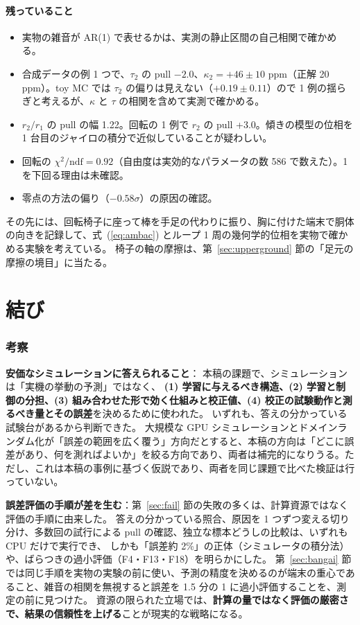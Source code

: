 \documentclass[paper=a4paper,fontsize=10pt,twocolumn,column_gap=2zw,line_length=24zw,number_of_lines=46,head_space=20mm]{jlreq}
\begin{document}
\subsection{残っていること}

\begin{itemize}\setlength{\itemsep}{0pt}
\item 実物の雑音が AR(1) で表せるかは、実測の静止区間の自己相関で確かめる。
\item 合成データの例 1 つで、$\tau_2$ の pull $-2.0$、$\kappa_2 = +46\pm10$ ppm（正解 20 ppm）。toy MC では $\tau_2$ の偏りは見えない（$+0.19\pm0.11$）ので 1 例の揺らぎと考えるが、$\kappa$ と $\tau$ の相関を含めて実測で確かめる。
\item $r_2/r_1$ の pull の幅 1.22。回転の 1 例で $r_2$ の pull +3.0。傾きの模型の位相を 1 台目のジャイロの積分で近似していることが疑わしい。
\item 回転の $\chi^2/\mathrm{ndf}=0.92$（自由度は実効的なパラメータの数 586 で数えた）。1 を下回る理由は未確認。
\item 零点の方法の偏り（$-0.58\sigma$）の原因の確認。
\end{itemize}
その先には、回転椅子に座って棒を手足の代わりに振り、胸に付けた端末で胴体の向きを記録して、式~(\ref{eq:ambac}) とループ 1 周の幾何学的位相を実物で確かめる実験を考えている。
椅子の軸の摩擦は、第~\ref{sec:upperground} 節の「足元の摩擦の境目」に当たる。


\part*{結び}

\section{考察}\label{sec:discuss}

\textbf{安価なシミュレーションに答えられること}：
本稿の課題で、シミュレーションは「実機の挙動の予測」ではなく、
\textbf{(1) 学習に与えるべき構造、(2) 学習と制御の分担、(3) 組み合わせた形で効く仕組みと校正値、(4) 校正の試験動作と測るべき量とその誤差}を決めるために使われた。
いずれも、答えの分かっている試験台があるから判断できた。
大規模な GPU シミュレーションとドメインランダム化が「誤差の範囲を広く覆う」方向だとすると、本稿の方向は「どこに誤差があり、何を測ればよいか」を絞る方向であり、両者は補完的になりうる。ただし、これは本稿の事例に基づく仮説であり、両者を同じ課題で比べた検証は行っていない。

\textbf{誤差評価の手順が差を生む}：第~\ref{sec:fail} 節の失敗の多くは、計算資源ではなく評価の手順に由来した。
答えの分かっている照合、原因を 1 つずつ変える切り分け、多数回の試行による pull の確認、独立な標本どうしの比較は、いずれも CPU だけで実行でき、
しかも「誤差約 2\%」の正体（シミュレータの積分法）や、ばらつきの過小評価（F4・F13・F18）を明らかにした。
第~\ref{sec:bangai} 節では同じ手順を実物の実験の前に使い、予測の精度を決めるのが端末の重心であること、雑音の相関を無視すると誤差を 1.5 分の 1 に過小評価することを、測定の前に見つけた。
資源の限られた立場では、\textbf{計算の量ではなく評価の厳密さで、結果の信頼性を上げる}ことが現実的な戦略になる。
\end{document}
